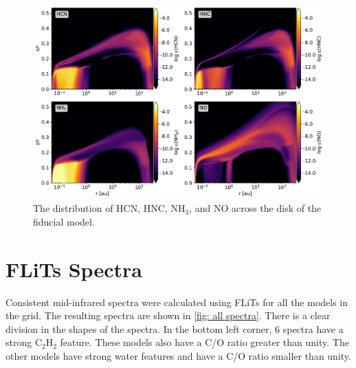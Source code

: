 \documentclass[twoside, single, authoryear, semicolon]{lion-msc}
\newcommand{\4}{$_4$}
\newcommand{\3}{$_3$}
\newcommand{\2}{$_2$}
\begin{document}
\begin{figure}[!ht]
    \centering
    \includegraphics[width=\linewidth]{Figures/Abundance2.pdf}
    \caption{The distribution of HCN, HNC, NH\3, and NO across the disk of the fiducial model.}
    \label{fig: nitrogen distribution}
\end{figure}

\newpage
\section{FLiTs Spectra}
Consistent mid-infrared spectra were calculated using FLiTs for all the models in the grid. The resulting spectra are shown in \autoref{fig: all spectra}. There is a clear division in the shapes of the spectra. In the bottom left corner, 6 spectra have a strong C\2H\2 feature. These models also have a C/O ratio greater than unity. The other models have strong water features and have a C/O ratio smaller than unity. 
\end{document}
